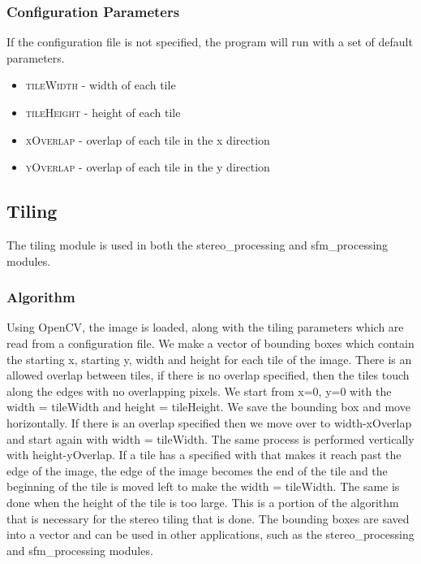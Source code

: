 \subsubsection{Configuration Parameters}
If the configuration file is not specified, the program will run with a set of default parameters.
\begin{itemize}
	\item{\textsc{tileWidth}} - width of each tile
	\item{\textsc{tileHeight}} - height of each tile
	\item{\textsc{xOverlap}} - overlap of each tile in the x direction
	\item{\textsc{yOverlap}} - overlap of each tile in the y direction
\end{itemize}


\subsection{Tiling}
The tiling module is used in both the stereo\_processing and sfm\_processing modules.
\subsubsection{Algorithm}
Using OpenCV, the image is loaded, along with the tiling parameters which are read from a configuration file. We make a vector of bounding boxes which contain the starting x, starting y, width and height for each tile of the image. There is an allowed overlap between tiles, if there is no overlap specified, then the tiles touch along the edges with no overlapping pixels. We start from x=0, y=0 with the width = tileWidth and height = tileHeight. We save the bounding box and move horizontally. If there is an overlap specified then we move over to width-xOverlap and start again with width = tileWidth. The same process is performed vertically with height-yOverlap. If a tile has a specified with that makes it reach past the edge of the image, the edge of the image becomes the end of the tile and the beginning of the tile is moved left to make the width = tileWidth. The same is done when the height of the tile is too large. This is a portion of the algorithm that is necessary for the stereo tiling that is done. The bounding boxes are saved into a vector and can be used in other applications, such as the stereo\_processing and sfm\_processing modules.









